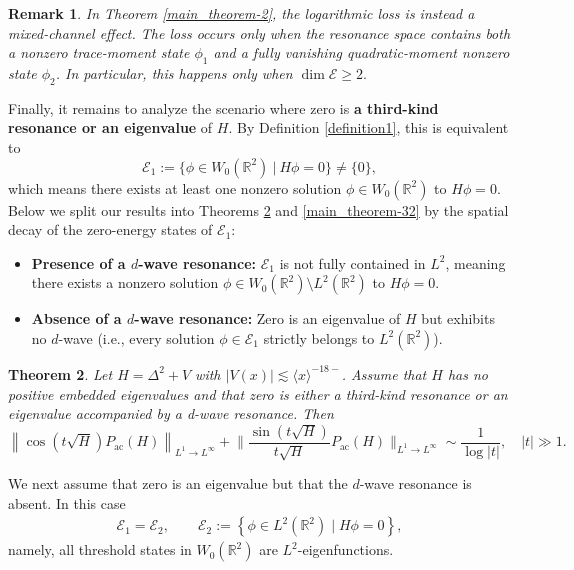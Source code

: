 \documentclass[reqno]{amsart}
\newtheorem{theorem}{Theorem}[section]
\newtheorem{remark}[theorem]{Remark}
\numberwithin{equation}{section}
\begin{document}
\begin{remark}
	{\rm In Theorem \ref{main_theorem-2}, the logarithmic loss is instead a mixed-channel effect.  The loss occurs only when the resonance space contains both a 
	nonzero trace-moment state $\phi_1$ and a fully vanishing quadratic-moment nonzero state $\phi_2$.
	In particular, this  happens only when
	$
	\dim\mathcal{E}\geq2.
	$}
\end{remark}





Finally, it remains to analyze the scenario where zero is \textbf{a third-kind resonance or an eigenvalue} of $H$.
By Definition \ref{definition1}, this is equivalent to   
$$ \mathcal{E}_1 := \big\{ \phi \in W_{0}(\mathbb{R}^2) \ \big| \ H\phi = 0 \big\} \neq \{0\},$$   
which means there exists at least one nonzero solution $\phi\in W_{0}(\mathbb{R}^2)$ to $H\phi=0.$   
Below we split our results into Theorems \ref{main_theorem-31} and \ref{main_theorem-32} by the spatial decay of the zero-energy states of $\mathcal{E}_1$:  
\begin{itemize}  
    \item \textbf{Presence of a $d$-wave resonance:}  $\mathcal{E}_1$ is not fully contained in $L^2$, meaning there exists a nonzero solution $\phi \in W_{0}(\mathbb{R}^2) \setminus L^2(\mathbb{R}^2)$ to $H\phi = 0$.  
    \vskip0.1cm
    \item \textbf{Absence of a $d$-wave resonance:} Zero is an eigenvalue of $H$ but exhibits no $d$-wave  (i.e., every solution $\phi \in \mathcal{E}_1$ strictly belongs to $L^2(\mathbb{R}^2)$).  
\end{itemize}  
  
\begin{theorem}\label{main_theorem-31}    
Let $H = \Delta^2 + V$ with $|V(x)| \lesssim \langle x \rangle^{-18-}$.   
Assume that $H$ has no positive embedded eigenvalues and that zero is either a third-kind resonance or an eigenvalue accompanied by a d-wave resonance. Then 
    \[ 
        \left\|\cos (t \sqrt{H}) P_{\mathrm{ac}}(H)\right\|_{L^1 \to L^{\infty}} +    
        \bigg\|\frac{\sin (t \sqrt{H})}{t\sqrt{H}} P_{\mathrm{ac}}(H)\bigg\|_{L^1 \to L^{\infty}} \sim \frac{1}{\log |t|}, \quad |t| \gg 1.    
    \]   
\end{theorem}  



We next assume that zero is an eigenvalue but that the $d$-wave
resonance is absent. In this case
\begin{align}\label{E--2}
\mathcal{E}_1
=
\mathcal{E}_2,
\qquad
\mathcal{E}_2
:=
\left\{
\phi\in L^2(\mathbb{R}^2)
\mid
H\phi=0
\right\},
\end{align}
namely, all threshold states in $W_0(\mathbb{R}^2)$ are 
$L^2$-eigenfunctions.
\end{document}
